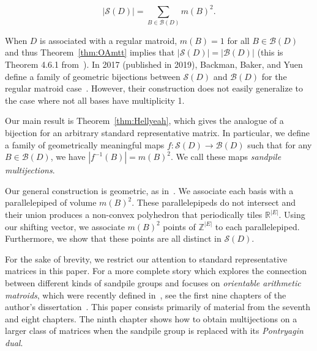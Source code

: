 \documentclass[ALCO,ThmDefs,Unicode,epreuves]{cedram}
\newcommand{\R}{\mathbb{R}}
\newcommand{\Z}{\mathbb{Z}}
\newcommand{\B}{\mathcal{B}}
\newcommand{\Sand}{\mathcal{S}}
\begin{document}
\begin{theorem}\label{thm:OAmtt} 
\[
|\Sand(D)| = \sum_{B \in \mathcal B(D)} m(B)^2.
\]
\end{theorem}

When $D$ is associated with a regular matroid, $m(B) = 1$ for all $B \in \B(D)$ and thus Theorem~\ref{thm:OAmtt} implies that $|\Sand(D)| = |\B(D)|$ (this is Theorem 4.6.1 from~\cite{Merino}). In 2017 (published in 2019), Backman, Baker, and Yuen define a family of geometric bijections between $\Sand(D)$ and $\B(D)$ for the regular matroid case~\cite{BBY,Yuen}. However, their construction does not easily generalize to the case where not all bases have multiplicity 1.

Our main result is Theorem~\ref{thm:Hellyeah}, which gives the analogue of a bijection for an arbitrary standard representative matrix. In particular, we define a family of geometrically meaningful maps $f: \Sand(D) \to \mathcal B(D)$ such that for any $B \in \mathcal B(D)$, we have $|f^{-1}(B)| = m(B)^2$. We call these maps \emph{sandpile multijections}. 

Our general construction is geometric, as in~\cite{BBY}. We associate each basis with a parallelepiped of volume $m(B)^2$. These parallelepipeds do not intersect and their union produces a non-convex polyhedron that periodically tiles $\R^{|E|}$. Using our shifting vector, we associate $m(B)^2$ points of $\Z^{|E|}$ to each parallelepiped. Furthermore, we show that these points are all distinct in $\Sand(D)$. 

For the sake of brevity, we restrict our attention to standard representative matrices in this paper. For a more complete story which explores the connection between different kinds of sandpile groups and focuses on \emph{orientable arithmetic matroids}, which were recently defined in~\cite{Pagaria}, see the first nine chapters of the author's dissertation~\cite{mythesis}. This paper consists primarily of material from the seventh and eight chapters. The ninth chapter shows how to obtain multijections on a larger class of matrices when the sandpile group is replaced with its \emph{Pontryagin dual}. 
\end{document}

